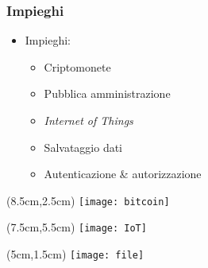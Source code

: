 \begin{frame}
  \frametitle{Impieghi}

  \begin{itemize}
   \item<1-> Impieghi:
   \begin{itemize}
    \item<2-> Criptomonete
    \item<3-> Pubblica amministrazione
    \item<4-> \textit{Internet of Things}
    \item<5-> Salvataggio dati
    \item<6-> Autenticazione \& autorizzazione
   \end{itemize}
  \end{itemize}

 \begin{textblock*}{5cm}(8.5cm,2.5cm)
  \texttt{[image: bitcoin]}
 \end{textblock*}

 \begin{textblock*}{5cm}(7.5cm,5.5cm)
  \texttt{[image: IoT]}
 \end{textblock*}
 
 \begin{textblock*}{5cm}(5cm,1.5cm)
  \texttt{[image: file]}
 \end{textblock*}


\end{frame}
